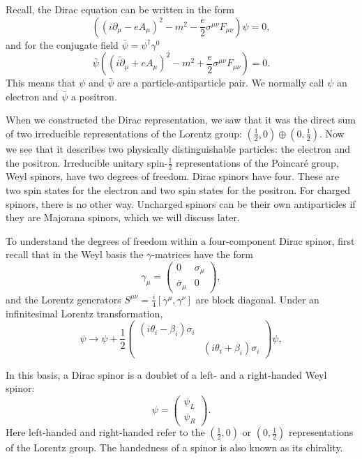 \documentclass[11pt]{article}
\theoremstyle{definition}
\begin{document}
Recall, the Dirac equation can be written in the form
\begin{equation}
    \left((i\partial_\mu - eA_\mu)^2 - m^2 - \frac{e}{2}\sigma^{\mu\nu}F_{\mu\nu}\right)\psi = 0,
\end{equation}
and for the conjugate field $\bar{\psi} = \psi^\dagger\gamma^0$
\begin{equation}
    \bar{\psi}\left((i\overleftarrow{\partial}_\mu + eA_\mu)^2 - m^2 + \frac{e}{2}\sigma^{\mu\nu}F_{\mu\nu}\right) = 0.
\end{equation}
This means that $\psi$ and $\bar{\psi}$ are a particle-antiparticle pair. We normally call $\psi$ an electron and $\bar{\psi}$ a positron.

When we constructed the Dirac representation, we saw that it was the direct sum of two irreducible representations of the Lorentz group: \( \left( \frac{1}{2}, 0 \right) \oplus \left( 0, \frac{1}{2} \right) \). Now we see that it describes two physically distinguishable particles: the electron and the positron. Irreducible unitary spin-\( \frac{1}{2} \) representations of the Poincaré group, Weyl spinors, have two degrees of freedom. Dirac spinors have four. These are two spin states for the electron and two spin states for the positron. For charged spinors, there is no other way. Uncharged spinors can be their own antiparticles if they are Majorana spinors, which we will discuss later.

To understand the degrees of freedom within a four-component Dirac spinor, first recall that in the Weyl basis the \(\gamma\)-matrices have the form
\begin{equation}
\gamma_{\mu} = \begin{pmatrix}
0 & \sigma_{\mu} \\
\bar{\sigma}_{\mu} & 0
\end{pmatrix},
\end{equation}
and the Lorentz generators \(S^{\mu\nu} = \frac{i}{4} [\gamma^{\mu}, \gamma^{\nu}]\) are block diagonal. Under an infinitesimal Lorentz transformation,
\begin{equation}
\psi \rightarrow \psi + \frac{1}{2} 
\begin{pmatrix}
     (i\theta_i - \beta_i) \sigma_i  & \\
     &  (i\theta_i + \beta_i) \sigma_i 
\end{pmatrix}
 \psi,
\end{equation}

In this basis, a Dirac spinor is a doublet of a left- and a right-handed Weyl spinor:
\begin{equation}
\psi = \begin{pmatrix}
\psi_L \\
\psi_R
\end{pmatrix}.
\end{equation}
Here left-handed and right-handed refer to the \(\left(\frac{1}{2}, 0\right)\) or \(\left(0, \frac{1}{2}\right)\) representations of the Lorentz group. The handedness of a spinor is also known as its chirality.
\end{document}
